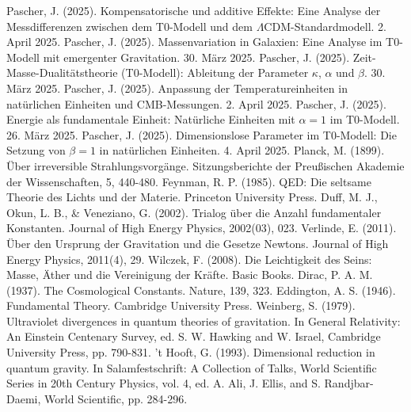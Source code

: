\documentclass[12pt,a4paper]{article}
\begin{document}
	\begin{thebibliography}{99}
		 Pascher, J. (2025). Kompensatorische und additive Effekte: Eine Analyse der Messdifferenzen zwischen dem T0-Modell und dem $\Lambda$CDM-Standardmodell. 2. April 2025.
		 Pascher, J. (2025). Massenvariation in Galaxien: Eine Analyse im T0-Modell mit emergenter Gravitation. 30. März 2025.
		 Pascher, J. (2025). Zeit-Masse-Dualitätstheorie (T0-Modell): Ableitung der Parameter $\kappa$, $\alpha$ und $\beta$. 30. März 2025.
		 Pascher, J. (2025). Anpassung der Temperatureinheiten in natürlichen Einheiten und CMB-Messungen. 2. April 2025.
		 Pascher, J. (2025). Energie als fundamentale Einheit: Natürliche Einheiten mit $\alpha = 1$ im T0-Modell. 26. März 2025.
		 Pascher, J. (2025). Dimensionslose Parameter im T0-Modell: Die Setzung von $\beta = 1$ in natürlichen Einheiten. 4. April 2025.
		 Planck, M. (1899). Über irreversible Strahlungsvorgänge. Sitzungsberichte der Preußischen Akademie der Wissenschaften, 5, 440-480.
		 Feynman, R. P. (1985). QED: Die seltsame Theorie des Lichts und der Materie. Princeton University Press.
		 Duff, M. J., Okun, L. B., \& Veneziano, G. (2002). Trialog über die Anzahl fundamentaler Konstanten. Journal of High Energy Physics, 2002(03), 023.
		 Verlinde, E. (2011). Über den Ursprung der Gravitation und die Gesetze Newtons. Journal of High Energy Physics, 2011(4), 29.
		 Wilczek, F. (2008). Die Leichtigkeit des Seins: Masse, Äther und die Vereinigung der Kräfte. Basic Books.
		 Dirac, P. A. M. (1937). The Cosmological Constants. Nature, 139, 323.
		 Eddington, A. S. (1946). Fundamental Theory. Cambridge University Press.
		 Weinberg, S. (1979). Ultraviolet divergences in quantum theories of gravitation. In General Relativity: An Einstein Centenary Survey, ed. S. W. Hawking and W. Israel, Cambridge University Press, pp. 790-831.
		 't Hooft, G. (1993). Dimensional reduction in quantum gravity. In Salamfestschrift: A Collection of Talks, World Scientific Series in 20th Century Physics, vol. 4, ed. A. Ali, J. Ellis, and S. Randjbar-Daemi, World Scientific, pp. 284-296.
	\end{thebibliography}
\end{document}
